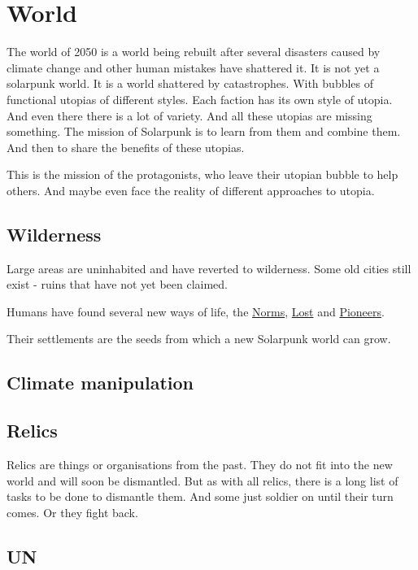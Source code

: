 \chapter{World}

The world of 2050 is a world being rebuilt after several disasters caused by climate change and other human mistakes have shattered it. It is not yet a solarpunk world. It is a world shattered by catastrophes. With bubbles of functional utopias of different styles.
Each faction has its own style of utopia. And even there there is a lot of variety.
And all these utopias are missing something. The mission of Solarpunk is to learn from them and combine them. And then to share the benefits of these utopias.

This is the mission of the protagonists, who leave their utopian bubble to help others. And maybe even face the reality of different approaches to utopia.

\section{Wilderness}

Large areas are uninhabited and have reverted to wilderness. Some old cities still exist - ruins that have not yet been claimed.

Humans have found several new ways of life, the \hyperref[sec:Norms]{Norms}, \hyperref[sec:Lost]{Lost} and \hyperref[sec:Pioneers]{Pioneers}.

Their settlements are the seeds from which a new Solarpunk world can grow.

\section{Climate manipulation}

\section{Relics}
\label{sec: Relic}
Relics are things or organisations from the past. They do not fit into the new world and will soon be dismantled. But as with all relics, there is a long list of tasks to be done to dismantle them. And some just soldier on until their turn comes. Or they fight back.

\section{UN}
\label{sec: UN}

